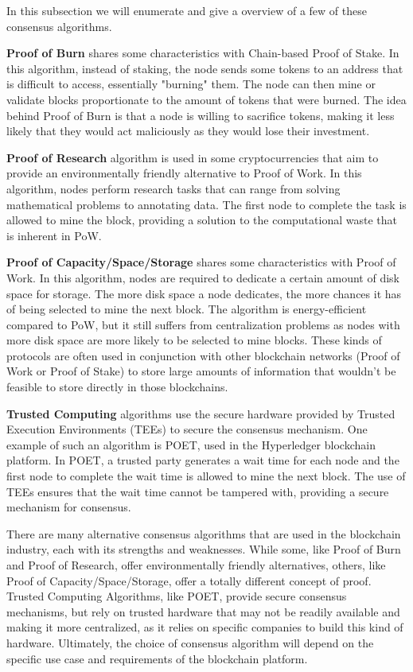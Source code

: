 In this subsection we will enumerate and give a overview of a few of these consensus algorithms.

\textbf{Proof of Burn} \cite{karantias2020proof} shares some characteristics with Chain-based Proof of Stake. In this algorithm, instead of staking, the node sends some tokens to an address that is difficult to access, essentially "burning" them. The node can then mine or validate blocks proportionate to the amount of tokens that were burned. The idea behind Proof of Burn is that a node is willing to sacrifice tokens, making it less likely that they would act maliciously as they would lose their investment.

\textbf{Proof of Research} \cite{gridcoin} algorithm is used in some cryptocurrencies that aim to provide an environmentally friendly alternative to Proof of Work. In this algorithm, nodes perform research tasks that can range from solving mathematical problems to annotating data. The first node to complete the task is allowed to mine the block, providing a solution to the computational waste that is inherent in PoW.

\textbf{Proof of Capacity/Space/Storage} \cite{dziembowski2015proofs} shares some characteristics with Proof of Work. In this algorithm, nodes are required to dedicate a certain amount of disk space for storage. The more disk space a node dedicates, the more chances it has of being selected to mine the next block. The algorithm is energy-efficient compared to PoW, but it still suffers from centralization problems as nodes with more disk space are more likely to be selected to mine blocks. These kinds of protocols are often used in conjunction with other blockchain networks (Proof of Work or Proof of Stake) to store large amounts of information that wouldn't be feasible to store directly in those blockchains.

\textbf{Trusted Computing} \cite{bowman2021elapsed} algorithms use the secure hardware provided by Trusted Execution Environments (TEEs) to secure the consensus mechanism. One example of such an algorithm is POET, used in the Hyperledger blockchain platform. In POET, a trusted party generates a wait time for each node and the first node to complete the wait time is allowed to mine the next block. The use of TEEs ensures that the wait time cannot be tampered with, providing a secure mechanism for consensus.

There are many alternative consensus algorithms that are used in the blockchain industry, each with its strengths and weaknesses.
While some, like Proof of Burn and Proof of Research, offer environmentally friendly alternatives, others, like Proof of Capacity/Space/Sto\-rage, offer a totally different concept of proof.
Trusted Computing Algorithms, like POET, provide secure consensus mechanisms, but rely on trusted hardware that may not be readily available and making it more centralized, as it relies on specific companies to build this kind of hardware.
Ultimately, the choice of consensus algorithm will depend on the specific use case and requirements of the blockchain platform.





